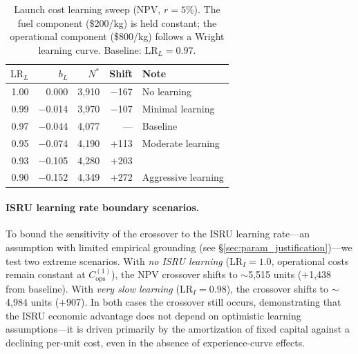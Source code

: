 \documentclass[preprint,12pt]{elsarticle}
\begin{document}
\begin{table}[htbp]
\centering
\caption{Launch cost learning sweep (NPV, $r = 5\%$). The fuel component (\$200/kg) is held constant; the operational component (\$800/kg) follows a Wright learning curve. Baseline: $\mathrm{LR}_L = 0.97$.}
\label{tab:launch_learning}
\small
\begin{tabular}{@{}rrrrl@{}}
\toprule
$\mathrm{LR}_L$ & $b_L$ & $N^*$ & Shift & Note \\
\midrule
1.00 & 0.000  & 3{,}910 & $-$167 & No learning \\
0.99 & $-$0.014 & 3{,}970 & $-$107 & Minimal learning \\
0.97 & $-$0.044 & 4{,}077 & ---    & Baseline \\
0.95 & $-$0.074 & 4{,}190 & $+$113 & Moderate learning \\
0.93 & $-$0.105 & 4{,}280 & $+$203 & \\
0.90 & $-$0.152 & 4{,}349 & $+$272 & Aggressive learning \\
\bottomrule
\end{tabular}
\end{table}

\paragraph{ISRU learning rate boundary scenarios.} To bound the sensitivity of the crossover to the ISRU learning rate---an assumption with limited empirical grounding (see \S\ref{sec:param_justification})---we test two extreme scenarios. With \emph{no ISRU learning} ($\mathrm{LR}_I = 1.0$, operational costs remain constant at $C_{\mathrm{ops}}^{(1)}$), the NPV crossover shifts to $\sim$5{,}515 units ($+$1{,}438 from baseline). With \emph{very slow learning} ($\mathrm{LR}_I = 0.98$), the crossover shifts to $\sim$4{,}984 units ($+$907). In both cases the crossover still occurs, demonstrating that the ISRU economic advantage does not depend on optimistic learning assumptions---it is driven primarily by the amortization of fixed capital against a declining per-unit cost, even in the absence of experience-curve effects.
\end{document}
